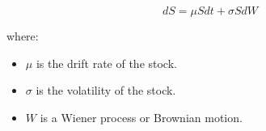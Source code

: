 \documentclass[../main.tex]{subfiles}
\begin{document}
\begin{equation}
    dS = \mu S dt + \sigma S dW
\end{equation}

where:
\begin{itemize}
    \item \( \mu \) is the drift rate of the stock.
    \item \( \sigma \) is the volatility of the stock.
    \item \( W \) is a Wiener process or Brownian motion.
\end{itemize}

\end{document}
